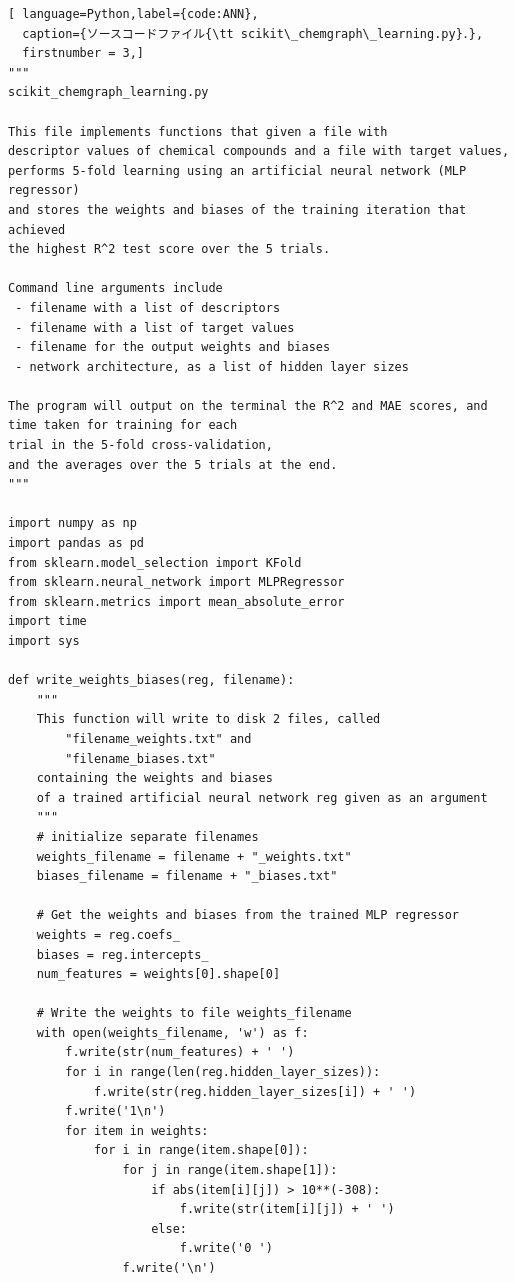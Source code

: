 \documentclass[11pt,titlepage,dvipdfmx,twoside]{jarticle}
\begin{document}
\begin{lstlisting}[ language=Python,label={code:ANN},
  caption={ソースコードファイル{\tt scikit\_chemgraph\_learning.py}．},
  firstnumber = 3,]
"""
scikit_chemgraph_learning.py

This file implements functions that given a file with
descriptor values of chemical compounds and a file with target values,
performs 5-fold learning using an artificial neural network (MLP regressor)
and stores the weights and biases of the training iteration that achieved
the highest R^2 test score over the 5 trials. 

Command line arguments include
 - filename with a list of descriptors
 - filename with a list of target values
 - filename for the output weights and biases
 - network architecture, as a list of hidden layer sizes
 
The program will output on the terminal the R^2 and MAE scores, and
time taken for training for each 
trial in the 5-fold cross-validation, 
and the averages over the 5 trials at the end.
"""

import numpy as np
import pandas as pd
from sklearn.model_selection import KFold
from sklearn.neural_network import MLPRegressor
from sklearn.metrics import mean_absolute_error
import time
import sys

def write_weights_biases(reg, filename):
    """ 
    This function will write to disk 2 files, called
        "filename_weights.txt" and
        "filename_biases.txt"
    containing the weights and biases 
    of a trained artificial neural network reg given as an argument
    """
    # initialize separate filenames
    weights_filename = filename + "_weights.txt"
    biases_filename = filename + "_biases.txt"
    
    # Get the weights and biases from the trained MLP regressor
    weights = reg.coefs_
    biases = reg.intercepts_
    num_features = weights[0].shape[0]
    
    # Write the weights to file weights_filename
    with open(weights_filename, 'w') as f:
        f.write(str(num_features) + ' ')
        for i in range(len(reg.hidden_layer_sizes)):
            f.write(str(reg.hidden_layer_sizes[i]) + ' ')
        f.write('1\n')
        for item in weights:
            for i in range(item.shape[0]):
                for j in range(item.shape[1]):
                    if abs(item[i][j]) > 10**(-308):
                        f.write(str(item[i][j]) + ' ')
                    else:
                        f.write('0 ')
                f.write('\n')
    

\end{lstlisting}
\end{document}
